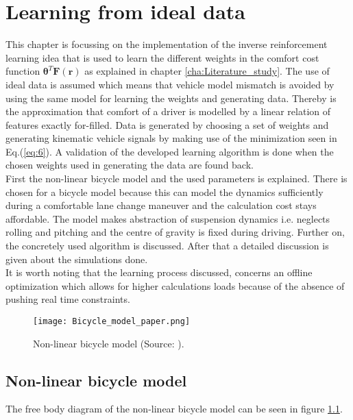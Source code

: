 \chapter{Learning from ideal data}
\label{cha:Learning_algorithm}

This chapter is focussing on the implementation of the inverse reinforcement learning idea that is used to learn the different weights in the comfort cost function $\bm{\theta}^T\bm{F}(\bm{r})$ as
explained in chapter \ref{cha:Literature_study}. The use of ideal data is assumed which means that vehicle model mismatch is avoided by using the same model for learning the weights and generating data. Thereby is the approximation that comfort of a driver is modelled by a linear relation of features exactly for-filled. Data is generated by choosing a set of weights and generating kinematic vehicle signals by making use of the minimization seen in Eq.(\ref{eq:6}). A validation of the developed learning algorithm is done when the chosen weights used in generating the data are found back.\\

First the non-linear bicycle model and the used parameters is explained. There is chosen for a bicycle model because this can model the dynamics sufficiently during a comfortable lane change maneuver and the calculation cost stays affordable. The model makes abstraction of suspension dynamics i.e. neglects rolling and pitching and the centre of gravity is fixed during driving. \cite{Yankov}  Further on, the concretely used algorithm is discussed. After that a detailed discussion is given about the simulations done.\\
It is worth noting that the learning process discussed, concerns an offline optimization which allows for higher calculations loads because of the absence of pushing real time constraints.

\begin{figure}[h!]
	\centering
	\texttt{[image: Bicycle\_model\_paper.png]}
	\caption{Non-linear bicycle model (Source: \cite{TongDuySon2019}).}
	\label{fig:bicycle_model}
\end{figure}
\section{Non-linear bicycle model}\label{sec:Vehicle_models}
The free body diagram of the non-linear bicycle model can be seen in figure \ref{fig:bicycle_model}.



